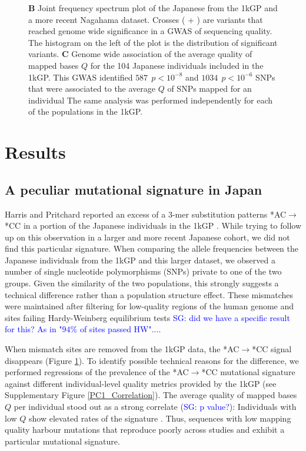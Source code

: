 \documentclass[9pt,lineno]{elife}
\newcommand{\sgcomment}[1]{\textcolor{blue}{SG: #1}}
\begin{document}
\begin{figure}
{\textbf{B} 
Joint frequency spectrum plot of the Japanese from the 1kGP and a more recent Nagahama dataset.
Crosses ( + ) are variants that reached genome wide significance in a GWAS of sequencing quality. 
The histogram on the left of the plot is the distribution of significant variants. 
\textbf{C} 
Genome wide association of the average quality of mapped bases $Q$ for the 104 Japanese individuals included in the 1kGP. This GWAS identified $587\ \  p < 10^{-8}$ and $1034\ \ p < 10^{-6}$ SNPs that were associated to the average $Q$ of SNPs mapped for an individual
The same analysis was performed independently for each of the populations in the 1kGP. }
 \label{SFS}
\end{figure}


\section{Results}

			
\subsection{A peculiar mutational signature in Japan}			
	
Harris and Pritchard reported an excess of a 3-mer substitution patterns *AC${\rightarrow}$*CC in a portion of the Japanese individuals in the 1kGP \citep{Harris2017a}.
While trying to follow up on this observation in a larger and more recent Japanese cohort, we did not find this particular signature.
When comparing the allele frequencies between the Japanese individuals from the 1kGP and this larger dataset, we observed a number of single nucleotide polymorphisms (SNPs) private to one of the two groups.
Given the similarity of the two populations, this strongly suggests a technical difference rather than a population structure effect.
These mismatches were maintained after filtering for low-quality regions of the human genome and sites failing Hardy-Weinberg equilibrium tests \sgcomment{did we have a specific result for this? As in "$94\%$ of sites passed HW"...}. 


When mismatch sites are removed from the 1kGP data, the  *AC${\rightarrow}$*CC signal disappears (Figure \ref{SFS}). To identify possible technical reasons for the difference, we performed regressions of the prevalence of the  *AC${\rightarrow}$*CC mutational signature against different individual-level quality metrics provided by the 1kGP (see Supplementary Figure \ref{PC1_Correlation}). The average quality of mapped bases  $Q$ per individual stood out as a strong correlate (\sgcomment {p value?}): Individuals with low $Q$ show elevated rates of the signature .
Thus, sequences with low mapping quality harbour mutations that reproduce poorly across studies and exhibit a particular mutational signature. 
\end{document}
